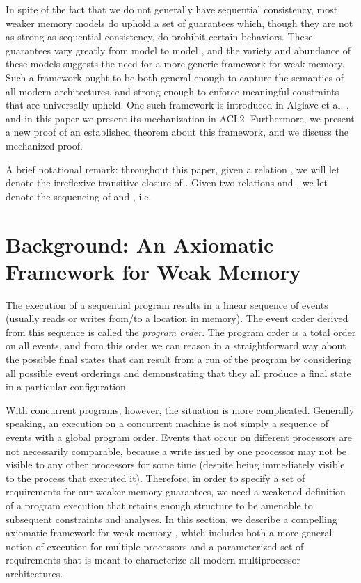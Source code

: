 \documentclass[]{eptcs}
\begin{document}
In spite of the fact that we do not generally have sequential consistency, most weaker memory models do uphold a set of guarantees which, though they are not as strong as sequential consistency, do prohibit certain behaviors. These guarantees vary greatly from model to model \cite{boudol09, chong08, owens09, sarkar11, sarkar09}, and the variety and abundance of these models suggests the need for a more generic framework for weak memory. Such a framework ought to be both general enough to capture the semantics of all modern architectures, and strong enough to enforce meaningful constraints that are universally upheld. One such framework is introduced in Alglave et al. \cite{alglave_cats}, and in this paper we present its mechanization in ACL2. Furthermore, we present a new proof of an established theorem about this framework, and we discuss the mechanized proof.

A brief notational remark: throughout this paper, given a relation , we will let  denote the irreflexive transitive closure of . Given two relations  and , we let  denote the sequencing of  and , i.e.


\section{Background: An Axiomatic Framework for Weak Memory}

The execution of a sequential program results in a linear sequence of events (usually reads or writes from/to a location in memory). The event order derived from this sequence is called the \emph{program order}. The program order is a total order on all events, and from this order we can reason in a straightforward way about the possible final states that can result from a run of the program by considering all possible event orderings and demonstrating that they all produce a final state in a particular configuration.

With concurrent programs, however, the situation is more complicated. Generally speaking, an execution on a concurrent machine is not simply a sequence of events with a global program order. Events that occur on different processors are not necessarily comparable, because a write issued by one processor may not be visible to any other processors for some time (despite being immediately visible to the process that executed it). Therefore, in order to specify a set of requirements for our weaker memory guarantees, we need a weakened definition of a program execution that retains enough structure to be amenable to subsequent constraints and analyses. In this section, we describe a compelling axiomatic framework for weak memory \cite{alglave_cats}, which includes both a more general notion of execution for multiple processors and a parameterized set of requirements that is meant to characterize all modern multiprocessor architectures.
\end{document}
